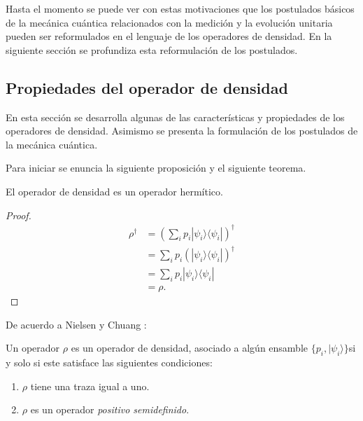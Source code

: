 Hasta el momento se puede ver con estas motivaciones que los postulados básicos
de la mecánica cuántica relacionados con la medición y la evolución unitaria
pueden ser reformulados en el lenguaje de los operadores de densidad. En la
siguiente sección se profundiza esta reformulación de los postulados.
 


\subsection{Propiedades del operador de densidad}\label{subsec:postulates} %

En esta sección se desarrolla algunas de las características y propiedades de
los operadores de densidad. Asimismo se presenta la formulación de los
postulados de la mecánica cuántica. 

Para iniciar se enuncia la siguiente proposición y el siguiente teorema. 

\begin{proposition}El operador de densidad es un operador hermítico.\end{proposition}


\begin{proof}
	\begin{equation}
		\begin{split}
			\rho^\dagger&={\left(\sum_{i} p_i|\psi_i\rangle \langle \psi_i|\right)}^{\dagger}\\
			&=\sum_{i} p_i {\left(|\psi_i\rangle \langle\psi_i|\right)}^{\dagger}\\
			&=\sum_{i} p_i |\psi_i\rangle \langle\psi_i|\\
			&=\rho.
		\end{split}
	\end{equation}
	
\end{proof}

De acuerdo a Nielsen y Chuang {\cite{nielsen_chuang_2010}}:
\begin{theorem} Un operador
$\rho$ es un operador de densidad, asociado a algún ensamble $\{p_i,
|\psi_i\rangle\}$si y solo si este satisface las siguientes condiciones:
\begin{enumerate}
	\item $\rho$ tiene una traza igual a uno.
	\item $\rho $ es un operador \textit{positivo semidefinido}.
\end{enumerate}	
\end{theorem}

